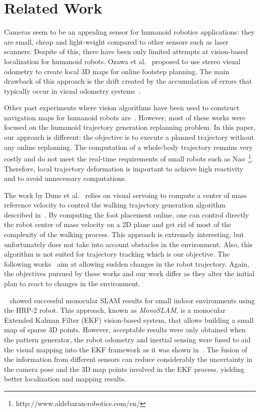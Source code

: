 \section{Related Work}\label{sec:related}
Cameras seem to be an appealing sensor for humanoid robotics applications: they are small, cheap and light-weight
compared to other sensors such as laser scanners. Despite of this, there have been only limited attempts at vision-based
localization for humanoid robots. Ozawa et al.~\cite{Ozawa05smc} proposed to use stereo visual odometry to create local 3D maps for
online footstep planning. The main drawback of this approach is the drift created by the accumulation of errors that typically
occur in visual odometry systems~\cite{Kaess09icra}. 

Other past experiments where vision algorithms have been used to construct navigation maps for humanoid robots are~\cite{Michel05humanoids,Michel06icra}. However, most of these works were focused on the humanoid trajectory generation replanning problem. In this paper, our approach is different: the objective is to execute a planned trajectory without any online replanning. The computation of a whole-body trajectory remains very costly and do not meet the real-time requirements of small robots such
as Nao~\footnote{http://www.aldebaran-robotics.com/en/}. Therefore, local trajectory deformation is important to achieve high reactivity and to avoid unnecessary computations.

The work by Dune et al.~\cite{Dune10iros} relies on visual servoing to compute a center of mass reference velocity to control the walking trajectory generation algorithm described in~\cite{Herdt10adr}. By
computing the foot placement online, one can control directly the robot center of mass velocity on a 2D plane and get rid of most of the complexity of the walking process. This approach is extremely interesting, but unfortunately does not take into account obstacles in the environment. Also, this algorithm is not suited for trajectory tracking which is our objective. The following works~\cite{Harada04humanoids,Morisawa07icra} aim at allowing sudden changes in the robot trajectory. Again, the objectives pursued by these works and our work differ as they alter the initial plan to react to changes in the environment.

~\citet{Davison07pami} showed successful monocular SLAM results for small indoor environments using the HRP-2 robot. This approach, known as \textit{MonoSLAM}, is a monocular Extended Kalman Filter (EKF) vision-based system, that allows building a small map of sparse 3D points. However, acceptable results were only obtained when the pattern generator, the robot odometry and inertial sensing were fused to aid
the visual mapping into the EKF framework as it was shown in~\cite{Stasse06iros}. The fusion of the information from different sensors can reduce considerably the uncertainty in the camera pose and the 3D map points involved in the EKF process, yielding better localization and mapping results.

